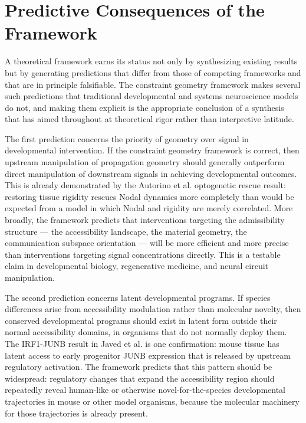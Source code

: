 \documentclass[12pt, a4paper, openany]{book}
\theoremstyle{definition}
\theoremstyle{remark}
\begin{document}
\section{Predictive Consequences of the Framework}

A theoretical framework earns its status not only by synthesizing existing results but by generating predictions that differ from those of competing frameworks and that are in principle falsifiable. The constraint geometry framework makes several such predictions that traditional developmental and systems neuroscience models do not, and making them explicit is the appropriate conclusion of a synthesis that has aimed throughout at theoretical rigor rather than interpretive latitude.

The first prediction concerns the priority of geometry over signal in developmental intervention. If the constraint geometry framework is correct, then upstream manipulation of propagation geometry should generally outperform direct manipulation of downstream signals in achieving developmental outcomes. This is already demonstrated by the Autorino et al. optogenetic rescue result: restoring tissue rigidity rescues Nodal dynamics more completely than would be expected from a model in which Nodal and rigidity are merely correlated. More broadly, the framework predicts that interventions targeting the admissibility structure — the accessibility landscape, the material geometry, the communication subspace orientation — will be more efficient and more precise than interventions targeting signal concentrations directly. This is a testable claim in developmental biology, regenerative medicine, and neural circuit manipulation.

The second prediction concerns latent developmental programs. If species differences arise from accessibility modulation rather than molecular novelty, then conserved developmental programs should exist in latent form outside their normal accessibility domains, in organisms that do not normally deploy them. The IRF1-JUNB result in Javed et al. is one confirmation: mouse tissue has latent access to early progenitor JUNB expression that is released by upstream regulatory activation. The framework predicts that this pattern should be widespread: regulatory changes that expand the accessibility region should repeatedly reveal human-like or otherwise novel-for-the-species developmental trajectories in mouse or other model organisms, because the molecular machinery for those trajectories is already present.
\end{document}
